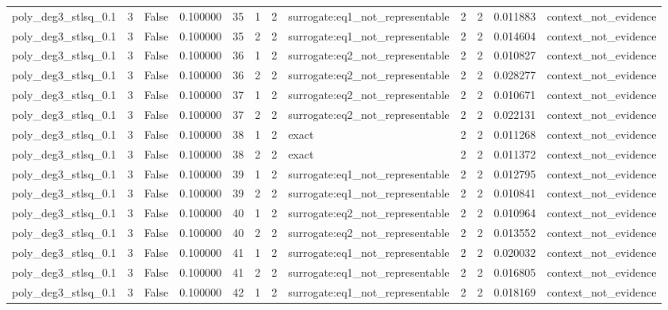 \begin{tabular}{lrrrrrrlrrrl}
poly\_deg3\_stlsq\_0.1 & 3 & False & 0.100000 & 35 & 1 & 2 & surrogate:eq1\_not\_representable & 2 & 2 & 0.011883 & context\_not\_evidence \\
poly\_deg3\_stlsq\_0.1 & 3 & False & 0.100000 & 35 & 2 & 2 & surrogate:eq1\_not\_representable & 2 & 2 & 0.014604 & context\_not\_evidence \\
poly\_deg3\_stlsq\_0.1 & 3 & False & 0.100000 & 36 & 1 & 2 & surrogate:eq2\_not\_representable & 2 & 2 & 0.010827 & context\_not\_evidence \\
poly\_deg3\_stlsq\_0.1 & 3 & False & 0.100000 & 36 & 2 & 2 & surrogate:eq2\_not\_representable & 2 & 2 & 0.028277 & context\_not\_evidence \\
poly\_deg3\_stlsq\_0.1 & 3 & False & 0.100000 & 37 & 1 & 2 & surrogate:eq2\_not\_representable & 2 & 2 & 0.010671 & context\_not\_evidence \\
poly\_deg3\_stlsq\_0.1 & 3 & False & 0.100000 & 37 & 2 & 2 & surrogate:eq2\_not\_representable & 2 & 2 & 0.022131 & context\_not\_evidence \\
poly\_deg3\_stlsq\_0.1 & 3 & False & 0.100000 & 38 & 1 & 2 & exact & 2 & 2 & 0.011268 & context\_not\_evidence \\
poly\_deg3\_stlsq\_0.1 & 3 & False & 0.100000 & 38 & 2 & 2 & exact & 2 & 2 & 0.011372 & context\_not\_evidence \\
poly\_deg3\_stlsq\_0.1 & 3 & False & 0.100000 & 39 & 1 & 2 & surrogate:eq1\_not\_representable & 2 & 2 & 0.012795 & context\_not\_evidence \\
poly\_deg3\_stlsq\_0.1 & 3 & False & 0.100000 & 39 & 2 & 2 & surrogate:eq1\_not\_representable & 2 & 2 & 0.010841 & context\_not\_evidence \\
poly\_deg3\_stlsq\_0.1 & 3 & False & 0.100000 & 40 & 1 & 2 & surrogate:eq2\_not\_representable & 2 & 2 & 0.010964 & context\_not\_evidence \\
poly\_deg3\_stlsq\_0.1 & 3 & False & 0.100000 & 40 & 2 & 2 & surrogate:eq2\_not\_representable & 2 & 2 & 0.013552 & context\_not\_evidence \\
poly\_deg3\_stlsq\_0.1 & 3 & False & 0.100000 & 41 & 1 & 2 & surrogate:eq1\_not\_representable & 2 & 2 & 0.020032 & context\_not\_evidence \\
poly\_deg3\_stlsq\_0.1 & 3 & False & 0.100000 & 41 & 2 & 2 & surrogate:eq1\_not\_representable & 2 & 2 & 0.016805 & context\_not\_evidence \\
poly\_deg3\_stlsq\_0.1 & 3 & False & 0.100000 & 42 & 1 & 2 & surrogate:eq1\_not\_representable & 2 & 2 & 0.018169 & context\_not\_evidence \\

\end{tabular}
